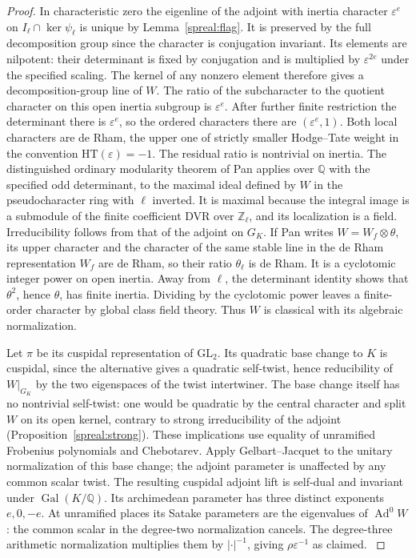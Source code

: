 \begin{proof}
In characteristic zero the eigenline of the adjoint with inertia
character \(\varepsilon^e\) on \(I_\ell\cap\ker\psi_\ell\) is
unique by Lemma~\ref{spreal:flag}. It is preserved by the full
decomposition group since the character is conjugation invariant.
Its elements are nilpotent: their determinant is fixed by
conjugation and is multiplied by \(\varepsilon^{2e}\) under the
specified scaling. The kernel of any nonzero element therefore
gives a decomposition-group line of \(W\). The ratio of the
subcharacter to the quotient character on this open inertia
subgroup is \(\varepsilon^e\). After further finite restriction
the determinant there is \(\varepsilon^e\), so the ordered
characters there are \((\varepsilon^e,1)\). Both local characters
are de Rham, the upper one of strictly smaller Hodge--Tate weight
in the convention \(\mathrm{HT}(\varepsilon)=-1\). The residual
ratio is nontrivial on inertia. The distinguished ordinary
modularity theorem of Pan applies over \(\mathbb Q\) with the
specified odd determinant, to the maximal ideal defined by \(W\)
in the pseudocharacter ring with \(\ell\) inverted. It is maximal
because the integral image is a submodule of the finite coefficient
DVR over \(\mathbb Z_\ell\), and its localization is a field.
Irreducibility follows from that of the adjoint on \(G_K\).
If Pan writes \(W=W_f\otimes\theta\), its upper character and
the character of the same stable line in the de Rham representation
\(W_f\) are de Rham, so their ratio \(\theta_\ell\) is de Rham.
It is a cyclotomic integer power on open inertia. Away from
\(\ell\), the determinant identity shows that \(\theta^2\), hence
\(\theta\), has finite inertia. Dividing by the cyclotomic power
leaves a finite-order character by global class field theory.
Thus \(W\) is classical with its algebraic normalization.
\cite[Theorem~5.1.1(2)]{panFM}

Let \(\pi\) be its cuspidal representation of \(\mathrm{GL}_2\).
Its quadratic base change to \(K\) is cuspidal, since the
alternative gives a quadratic self-twist, hence reducibility of
\(W|_{G_K}\) by the two eigenspaces of the twist intertwiner.
The base change itself has no nontrivial self-twist: one would be
quadratic by the central character and split \(W\) on its open
kernel, contrary to strong irreducibility of the adjoint
(Proposition~\ref{spreal:strong}). These implications use equality
of unramified Frobenius polynomials and Chebotarev. Apply
Gelbart--Jacquet to the unitary normalization of this base change;
the adjoint parameter is unaffected by any common scalar twist.
The resulting cuspidal
adjoint lift is self-dual and invariant under
\(\operatorname{Gal}(K/\mathbb Q)\). Its archimedean parameter has
three distinct exponents \(e,0,-e\). At unramified places its
Satake parameters are the eigenvalues of \(\operatorname{Ad}^0W\):
the common scalar in the degree-two normalization cancels. The
degree-three arithmetic normalization multiplies them by
\(|\cdot|^{-1}\), giving \(\rho\varepsilon^{-1}\) as claimed.
\cite[Chapter~III, Theorems~4.2 and~5.1]{arthurClozelBC}
\cite[Theorem~9.3]{gelbartJacquetAdj}
\end{proof}

